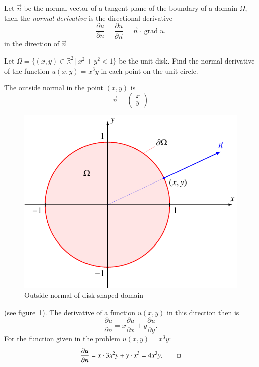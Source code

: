 \begin{definition}
\label{definition:normal-derivative}
Let $\vec{n}$ be the normal vector of a tangent plane of the boundary
of a domain $\Omega$, then the {\em normal derivative}
is the directional derivative
\[
\frac{\partial u}{\partial n}
=
\frac{\partial u}{\partial \vec{n}}
=
\vec{n}\cdot \operatorname{grad}u .
\]
in the direction of $\vec{n}$
\end{definition}

\begin{beispiel}
Let $\Omega=\{(x,y)\in\mathbb R^2\,|\,x^2+y^2<1\}$ be the unit disk.
Find the normal derivative of the function
$u(x,y)=x^3y$
in each point on the unit circle.

The outside normal in the point $(x,y)$ is
\[
\vec n=\begin{pmatrix}x\\y\end{pmatrix}
\]
\begin{figure}
\centering
\includegraphics{2-classification/images/disk.pdf}
\caption{Outside normal of disk shaped domain
\label{conditions:outside-normal}}
\end{figure}
(see figure~\ref{conditions:outside-normal}).
The derivative of a function $u(x,y)$
in this direction then is
\[
\frac{\partial u}{\partial n}=
x\frac{\partial u}{\partial x}
+
y\frac{\partial u}{\partial y}.
\]
For the function given in the problem $u(x,y)=x^3y$:
\[
\frac{\partial u}{\partial n}
=
x\cdot 3x^2y+y\cdot x^3=
4x^3y.
\qedhere
\]
\end{beispiel}

